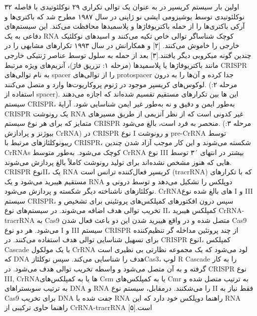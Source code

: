 \documentclass[12pt,a4paper,BCOR=.7cm,headsepline,bibliography=totoc]{report}
\begin{document}
اولین بار سیستم کریسپر در
 به عنوان یک توالی تکراری ۲۹ نوکلئوتیدی با فاصله ۳۲ نوکلئوتیدی توسط یوشیزومی ایشی نو ژاپنی در سال ۱۹۸۷ مطرح شد که باکتری‌ها و آرکی باکتری‌ها را از حمله باکتریوفاژها و پلاسمیدها محافظت می‌کند. این سیستم‌های دفاعی به یک RNA کوچک شناساگر توالی خاص تکیه می‌کنند و اسیدهای نوکلئیک خارجی را خاموش می‌کنند.
[۲] 
 و همکارانش در سال ۱۹۹۳ تکرارهای مشابهی را در چندین گونه میکروبی دیگر یافتند.[۳]
بعد از حمله به سلول توسط عناصر ژنتیکی خارجی مانند باکتریوفاژها یا پلاسمیدها (مرحله ۱: تزریق فاژ)، آنزیم‌های ویژه مرتبط CRISPR
 به نام
 توالی‌های spacer را از توالی‌های protospacer جدا کرده و آن‌ها را به درون لوکوس‌های کریسپر موجود در ژنوم پروکاریوت‌ها وارد و متصل می‌کنند. (مرحله ۲: استفاده از spacer). این 
ها
 بین تکرارهای مستقیم تقسیم شده‌اند که اجازه می‌دهند سیستم CRISPR، به‌طور ایمن و دقیق و نه به‌طور غیر ایمن شناسایی شود. آرایهٔ CRISPR یک رونوشت RNA غیر کدونی است که از نظر آنزیمی از طریق مسیرهای متمایز که برای هر نوع سیستم CRISPR منحصر به فرد است، بالغ می‌شود. (مرحله ۳: بیوژنز و پرادازش CrRNA) در CRISPR نوع I و
رونوشت pre-CrRNA توسط ریبونوکلئازهای مرتبط با CRISPR، شکسته می‌شوند و این کار موجب آزاد شدن چندین CrRNAs کوچک می‌شود. به‌طور متوسط CrRNA نوع III بیشتر در انتهای ´۳ توسط
 هایی 
که هنوز مشخص نشده‌اند برای تولید رونوشت کاملاً بالغ پردازش می‌شوند. CRISPR نوعII، یک RNA کریسپر فعال‌کننده ترانس است (tracrRNA) که با تکرارهای مستقیم هیبرید می‌شود و یک RNA دوپلکس را تشکیل می‌دهد و توسط 
 درونی و نوکلئازهای ناشناخته دیگر شکسته و پردازش می‌شود. CrRNAهای بالغ شده نوع I و III سیستم CRISPR، سپس درون افکتورهای کمپلکس‌های پروتئینی برای تشخیص و تخریب توالی هدف اضافه می‌شوند. در سیستم‌های نوع II، کمپلکس هیبرید CrRNA-tracrRNA به Cas9 متصل شده و در واقع هیبرید شدن این دو باعث فعال شدن Cas9 می‌شود. هر دو نوع I و III سیستم CRISPR از چند پروتئین مداخله گر تنظیم‌کننده برای تسهیل شناسایی توالی هدف استفاده می‌کنند. در CRISPR نوعI، کمپلکس Cascade با یک مولکول CrRNA لود می‌شود که یک مجموعه نظارتی بی نظیری است که DNA هدف را شناسایی می‌کند. سپس نوکلئازCas3، لوپ R Cascade را به کار گرفته و به آن متصل می‌شود و واسطه تخریب توالی هدف می‌شود. در CRISPR نوع III, CrRNAها یا به کمپلکس‌های Csm یا به کمپلکس‌های Cmr به ترتیب متصل شده و به ترتیب سوبستراهای DNA و RNA را می‌شکنند. درمقابل، سیستم نوع II فقط نیاز به Cas9 برای تخریب DNA جفت شده با RNA راهنما دوپلکس خود دارد که این RNA راهنما حاوی ترکیبی از CrRNA-tracrRNA است.[۵]
\end{document}
